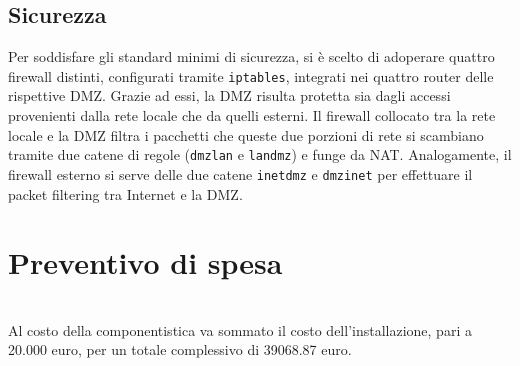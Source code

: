 \documentclass[]{scrartcl}
\def\code#1{\texttt{#1}}
\begin{document}
\subsection{Sicurezza}
Per soddisfare gli standard minimi di sicurezza, si è scelto di adoperare quattro firewall distinti, configurati tramite \code{iptables}, integrati nei quattro router delle rispettive DMZ. Grazie ad essi, la DMZ risulta protetta sia dagli accessi provenienti dalla rete locale che da quelli esterni. Il firewall collocato tra la rete locale e la DMZ filtra i pacchetti che queste due porzioni di rete si scambiano tramite due catene di regole (\code{dmzlan} e \code{landmz}) e funge da NAT. Analogamente, il firewall esterno si serve delle due catene \code{inetdmz} e \code{dmzinet} per effettuare il packet filtering tra Internet e la DMZ.
\section{Preventivo di spesa}

\begin{table}[H]
	\centering
	\label{costo componentistica}
	\caption{Costo delle componenti hardware}
\end{table}
\ \\Al costo della componentistica va sommato il costo dell'installazione, pari a 20.000 euro, per un totale complessivo di 39068.87 euro.
\end{document}
